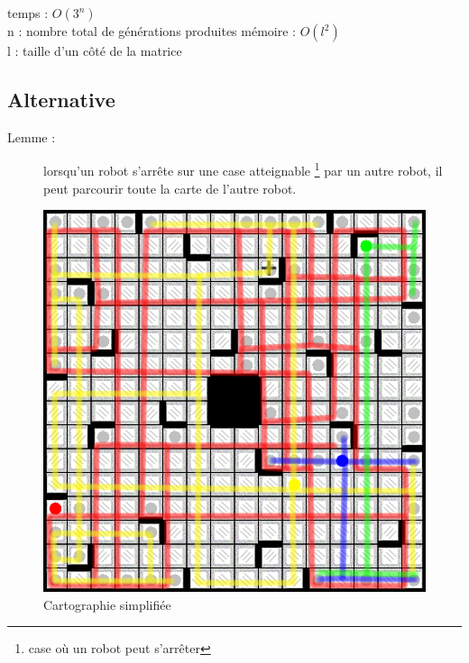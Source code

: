 \documentclass{beamer}
\begin{document}
\begin{frame}
  \vfill
  \begin{center}
    temps : $O(3^n)$\\
    n : nombre total de g\'en\'erations produites
    \vfill
    m\'emoire : $O(l^2)$\\
    l : taille d'un c\^ot\'e de la matrice
  \end{center}
  \vfill
\end{frame}

\subsection{Alternative}

\begin{frame}
  \vfill
  \vfill
\end{frame}

\begin{frame}
 \begin{description}
  \item[Lemme : ] lorsqu'un robot s'arrête sur une case atteignable \footnote{case où un robot peut s'arrêter} par un autre robot, il peut parcourir toute la carte de l'autre robot.
 \end{description}
\end{frame}

\begin{frame}
  \begin{figure}[htbp]
    \centering
    \includegraphics[width=.7\linewidth]{img/chemins_initiaux.png}
    \caption{Cartographie simplifi\'ee}
  \end{figure}
\end{frame}
\end{document}
